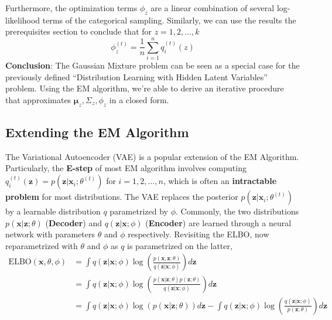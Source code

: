 Furthermore, the optimization terms $\phi_z$ are a linear combination of several log-likelihood terms of the categorical sampling. Similarly, we can use the results the prerequisites section to conclude that for $z=1,2,\dots,k$
\[
\phi_z^{(t)}  = \frac{1}{n} \sum_{i=1}^n q_i^{(t)}(z)
\]
\textbf{Conclusion}: The Gaussian Mixture problem can be seen as a special case for the previously defined ``Distribution Learning with Hidden Latent Variables'' problem. Using the EM algorithm, we're able to derive an iterative procedure that approximates $\boldsymbol{\mu}_z,\Sigma_z,\phi_z$ in a closed form.
\subsection{Extending the EM Algorithm}
The Variational Autoencoder (VAE) \cite{vae} is a popular extension of the EM Algorithm. Particularly, the \textbf{E-step} of most EM algorithm involves computing $q_i^{(t)}(\mathbf{z})=p(\mathbf{z}|\mathbf{x}_i;\theta^{(t)})$ for $i=1,2,\dots,n$, which is often an \textbf{intractable problem} for most distributions. The VAE replaces the posterior $p(\mathbf{z}|\mathbf{x}_i;\theta^{(t)})$ by a learnable distribution $q$ parametrized by $\phi$. Commonly, the two distributions $p(\mathbf{x}|\mathbf{z};\theta)$ (\textbf{Decoder}) and $q(\mathbf{z}|\mathbf{x};\phi)$ (\textbf{Encoder}) are learned through a neural network with parameters $\theta$ and $\phi$ respectively. Revisiting the ELBO, now reparametrized with $\theta$ and $\phi$ as $q$ is parametrized on the latter,
\begin{align*}
    \text{ELBO}(\mathbf{x},\theta,\phi)
    &= \int q(\mathbf{z}|\mathbf{x};\phi) \log\left(\frac{p(\mathbf{x},\mathbf{z};\theta)}{q(\mathbf{z}|\mathbf{x};\phi)}\right) d\mathbf{z} \\
    &= \int q(\mathbf{z}|\mathbf{x};\phi) \log\left(\frac{p(\mathbf{x}|\mathbf{z};\theta)p(\mathbf{z};\theta)}{q(\mathbf{z}|\mathbf{x};\phi)}\right) d\mathbf{z} \\
    &= \int q(\mathbf{z}|\mathbf{x};\phi) \log(p(\mathbf{x}|\mathbf{z};\theta)) d\mathbf{z} - \int q(\mathbf{z}|\mathbf{x};\phi) \log\left(\frac{q(\mathbf{z}|\mathbf{x};\phi)}{p(\mathbf{z};\theta)}\right) d\mathbf{z}
\end{align*}
